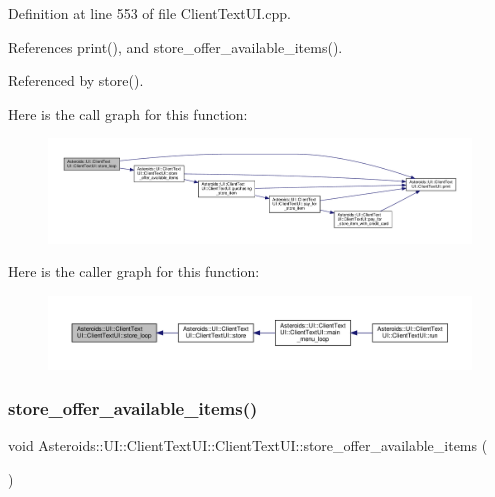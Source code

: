 Definition at line 553 of file Client\+Text\+U\+I.\+cpp.



References print(), and store\+\_\+offer\+\_\+available\+\_\+items().



Referenced by store().

Here is the call graph for this function\+:
\nopagebreak
\begin{figure}[H]
\begin{center}
\leavevmode
\includegraphics[width=350pt]{classAsteroids_1_1UI_1_1ClientTextUI_1_1ClientTextUI_a66aab545b0cd59af6bec829a1b82be89_cgraph}
\end{center}
\end{figure}
Here is the caller graph for this function\+:
\nopagebreak
\begin{figure}[H]
\begin{center}
\leavevmode
\includegraphics[width=350pt]{classAsteroids_1_1UI_1_1ClientTextUI_1_1ClientTextUI_a66aab545b0cd59af6bec829a1b82be89_icgraph}
\end{center}
\end{figure}
\mbox{\label{classAsteroids_1_1UI_1_1ClientTextUI_1_1ClientTextUI_a9175792a129c214f55dd0bda9ac36b33}} 
\subsubsection{\texorpdfstring{store\+\_\+offer\+\_\+available\+\_\+items()}{store\_offer\_available\_items()}}
{\footnotesize\ttfamily void Asteroids\+::\+U\+I\+::\+Client\+Text\+U\+I\+::\+Client\+Text\+U\+I\+::store\+\_\+offer\+\_\+available\+\_\+items (\begin{DoxyParamCaption}{ }\end{DoxyParamCaption})\hspace{0.3cm}{\ttfamily [private]}}



